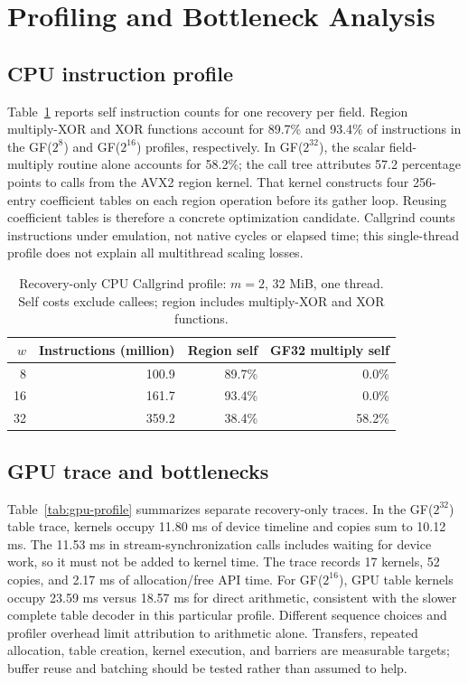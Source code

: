 \documentclass[conference]{IEEEtran}
\begin{document}
\section{Profiling and Bottleneck Analysis}
\subsection{CPU instruction profile}
\label{sec:profile}
Table~\ref{tab:cpu-profile} reports self instruction counts for one recovery per field. Region multiply-XOR and XOR functions account for 89.7\% and 93.4\% of instructions in the GF($2^8$) and GF($2^{16}$) profiles, respectively. In GF($2^{32}$), the scalar field-multiply routine alone accounts for 58.2\%; the call tree attributes 57.2 percentage points to calls from the AVX2 region kernel. That kernel constructs four 256-entry coefficient tables on each region operation before its gather loop. Reusing coefficient tables is therefore a concrete optimization candidate. Callgrind counts instructions under emulation, not native cycles or elapsed time; this single-thread profile does not explain all multithread scaling losses.

\begin{table}[t]
\caption{Recovery-only CPU Callgrind profile: $m=2$, 32 MiB, one thread. Self costs exclude callees; region includes multiply-XOR and XOR functions.}
\label{tab:cpu-profile}
\centering
\footnotesize
\begin{tabular}{rrrr}
\hline
$w$ & Instructions (million) & Region self & GF32 multiply self\\
\hline
8&100.9&89.7\%&0.0\%\\
16&161.7&93.4\%&0.0\%\\
32&359.2&38.4\%&58.2\%\\
\hline
\end{tabular}
\end{table}

\subsection{GPU trace and bottlenecks}
Table~\ref{tab:gpu-profile} summarizes separate recovery-only traces. In the GF($2^{32}$) table trace, kernels occupy 11.80 ms of device timeline and copies sum to 10.12 ms. The 11.53 ms in stream-synchronization calls includes waiting for device work, so it must not be added to kernel time. The trace records 17 kernels, 52 copies, and 2.17 ms of allocation/free API time. For GF($2^{16}$), GPU table kernels occupy 23.59 ms versus 18.57 ms for direct arithmetic, consistent with the slower complete table decoder in this particular profile. Different sequence choices and profiler overhead limit attribution to arithmetic alone. Transfers, repeated allocation, table creation, kernel execution, and barriers are measurable targets; buffer reuse and batching should be tested rather than assumed to help.
\end{document}
